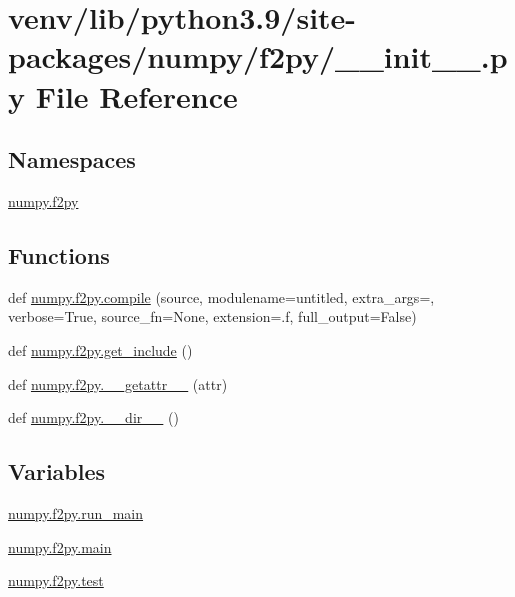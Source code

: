 \hypertarget{venv_2lib_2python3_89_2site-packages_2numpy_2f2py_2____init_____8py}{}\section{venv/lib/python3.9/site-\/packages/numpy/f2py/\+\_\+\+\_\+init\+\_\+\+\_\+.py File Reference}
\label{venv_2lib_2python3_89_2site-packages_2numpy_2f2py_2____init_____8py}
\subsection*{Namespaces}
\begin{DoxyCompactItemize}
\item 
 \hyperlink{namespacenumpy_1_1f2py}{numpy.\+f2py}
\end{DoxyCompactItemize}
\subsection*{Functions}
\begin{DoxyCompactItemize}
\item 
def \hyperlink{namespacenumpy_1_1f2py_a7147a103fc7e183b7293a8d1875ac811}{numpy.\+f2py.\+compile} (source, modulename=\textquotesingle{}untitled\textquotesingle{}, extra\+\_\+args=\textquotesingle{}\textquotesingle{}, verbose=True, source\+\_\+fn=None, extension=\textquotesingle{}.f\textquotesingle{}, full\+\_\+output=False)
\item 
def \hyperlink{namespacenumpy_1_1f2py_a86217766518812d31ed0d0d013e34f44}{numpy.\+f2py.\+get\+\_\+include} ()
\item 
def \hyperlink{namespacenumpy_1_1f2py_a62e42f028958f5e5b33efa5da3a0d233}{numpy.\+f2py.\+\_\+\+\_\+getattr\+\_\+\+\_\+} (attr)
\item 
def \hyperlink{namespacenumpy_1_1f2py_ad884293624bce4c29b240358e0d72371}{numpy.\+f2py.\+\_\+\+\_\+dir\+\_\+\+\_\+} ()
\end{DoxyCompactItemize}
\subsection*{Variables}
\begin{DoxyCompactItemize}
\item 
\hyperlink{namespacenumpy_1_1f2py_a919efb5b504fa6d7d964c281a6df424e}{numpy.\+f2py.\+run\+\_\+main}
\item 
\hyperlink{namespacenumpy_1_1f2py_aa1d5945d8dfb724d522255a5800ceb6a}{numpy.\+f2py.\+main}
\item 
\hyperlink{namespacenumpy_1_1f2py_aa503223006f0a755dbcd59201c29a32e}{numpy.\+f2py.\+test}
\end{DoxyCompactItemize}
